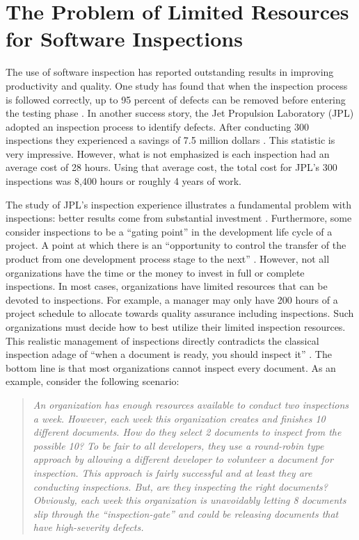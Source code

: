 \section{The Problem of Limited Resources for Software Inspections}
The use of software inspection has reported outstanding results in
improving productivity and quality. One study has found that when the
inspection process is followed correctly, up to 95 percent of defects can
be removed before entering the testing phase \cite{Bush90}. In another
success story, the Jet Propulsion Laboratory (JPL) adopted an inspection
process to identify defects. After conducting 300 inspections they
experienced a savings of 7.5 million dollars \cite{Bush90a}. This statistic
is very impressive. However, what is not emphasized is each inspection had
an average cost of 28 hours. Using that average cost, the total cost for
JPL's 300 inspections was 8,400 hours or roughly 4 years of work.

The study of JPL's inspection experience illustrates a fundamental problem
with inspections: better results come from substantial investment
\cite{Gilb93}. Furthermore, some consider inspections to be a ``gating
point'' in the development life cycle of a project. A point at which there
is an ``opportunity to control the transfer of the product from one
development process stage to the next'' \cite{Ebenau94, Wiegers98}.
However, not all organizations have the time or the money to invest in full
or complete inspections. In most cases, organizations have limited
resources that can be devoted to inspections. For example, a manager may
only have 200 hours of a project schedule to allocate towards quality
assurance including inspections. Such organizations must decide how to best
utilize their limited inspection resources. This realistic management of
inspections directly contradicts the classical inspection adage of ``when a
document is ready, you should inspect it'' \cite{Ebenau94}. The bottom line
is that most organizations cannot inspect every document. As an example,
consider the following scenario:

\begin{quotation}
  \textit{An organization has enough resources available to conduct two
    inspections a week. However, each week this organization creates and
    finishes 10 different documents. How do they select 2 documents to
    inspect from the possible 10? To be fair to all developers, they use a
    round-robin type approach by allowing a different developer to
    volunteer a document for inspection. This approach is fairly successful
    and at least they are conducting inspections. But, are they inspecting
    the right documents? Obviously, each week this organization is
    unavoidably letting 8 documents slip through the ``inspection-gate''
    and could be releasing documents that have high-severity defects.}
\end{quotation}

